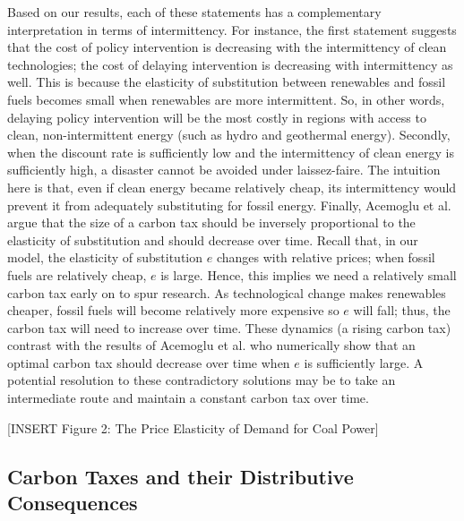 \documentclass[11pt,a4paper,leqno]{extarticle}
\begin{document}
	Based on our results, each of these statements has a complementary interpretation in terms of intermittency. For instance, the first statement suggests that the cost of policy intervention is decreasing with the intermittency of clean technologies; the cost of delaying intervention is decreasing with intermittency as well. This is because the elasticity of substitution between renewables and fossil fuels becomes small when renewables are more intermittent.  So, in other words, delaying policy intervention will be the most costly in regions with access to clean, non-intermittent energy (such as hydro and geothermal energy). Secondly,  when the discount rate is sufficiently low and the intermittency of clean energy is sufficiently high, a disaster cannot be avoided under laissez-faire. The intuition here is that, even if clean energy became relatively cheap, its intermittency would prevent it from adequately substituting for fossil energy. Finally, Acemoglu et al. argue that the size of a carbon tax should be inversely proportional to the elasticity of substitution and should decrease over time. Recall that, in our model, the elasticity of substitution $e$ changes with relative prices; when fossil fuels are relatively cheap, $e$ is large. Hence, this implies we need a relatively small carbon tax early on to spur research. As technological change makes renewables cheaper, fossil fuels will become relatively more expensive so $e$ will fall; thus, the carbon tax will need to increase over time. These dynamics (a rising carbon tax) contrast with the results of Acemoglu et al. who numerically show that an optimal carbon tax should decrease over time when $e$ is sufficiently large. A potential resolution to these contradictory solutions may be to take an intermediate route and maintain a constant carbon tax over time. 
	
	
	\vspace{0.15in}
	\begin{center}
		[INSERT Figure 2: The Price Elasticity of Demand for Coal Power]
	\end{center}
	\vspace{0.15in}
	

	
	
	\subsection{Carbon Taxes and their Distributive Consequences}
	
\end{document}
